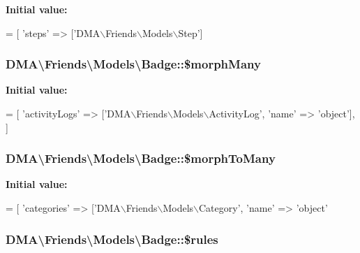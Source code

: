 {\bfseries Initial value\-:}
\begin{DoxyCode}
= [
        \textcolor{stringliteral}{'steps'} => [\textcolor{stringliteral}{'DMA\(\backslash\)Friends\(\backslash\)Models\(\backslash\)Step'}]
\end{DoxyCode}
\hypertarget{classDMA_1_1Friends_1_1Models_1_1Badge_a239fed984baad287f15badaaece428ff}{
\subsubsection[{\$morph\-Many}]{\setlength{\rightskip}{0pt plus 5cm}D\-M\-A\textbackslash{}\-Friends\textbackslash{}\-Models\textbackslash{}\-Badge\-::\$morph\-Many}}\label{classDMA_1_1Friends_1_1Models_1_1Badge_a239fed984baad287f15badaaece428ff}
{\bfseries Initial value\-:}
\begin{DoxyCode}
= [
        \textcolor{stringliteral}{'activityLogs'}  => [\textcolor{stringliteral}{'DMA\(\backslash\)Friends\(\backslash\)Models\(\backslash\)ActivityLog'}, \textcolor{stringliteral}{'name'} => \textcolor{stringliteral}{'object'}],
    ]
\end{DoxyCode}
\hypertarget{classDMA_1_1Friends_1_1Models_1_1Badge_a2efb4ca933422dfb4ca416676d73cad0}{
\subsubsection[{\$morph\-To\-Many}]{\setlength{\rightskip}{0pt plus 5cm}D\-M\-A\textbackslash{}\-Friends\textbackslash{}\-Models\textbackslash{}\-Badge\-::\$morph\-To\-Many}}\label{classDMA_1_1Friends_1_1Models_1_1Badge_a2efb4ca933422dfb4ca416676d73cad0}
{\bfseries Initial value\-:}
\begin{DoxyCode}
= [
        \textcolor{stringliteral}{'categories'}    => [\textcolor{stringliteral}{'DMA\(\backslash\)Friends\(\backslash\)Models\(\backslash\)Category'}, \textcolor{stringliteral}{'name'} => \textcolor{stringliteral}{'object'}
\end{DoxyCode}
\hypertarget{classDMA_1_1Friends_1_1Models_1_1Badge_ab750ee2c75af273ca930a12b1a20b3ae}{
\subsubsection[{\$rules}]{\setlength{\rightskip}{0pt plus 5cm}D\-M\-A\textbackslash{}\-Friends\textbackslash{}\-Models\textbackslash{}\-Badge\-::\$rules}}\label{classDMA_1_1Friends_1_1Models_1_1Badge_ab750ee2c75af273ca930a12b1a20b3ae}
